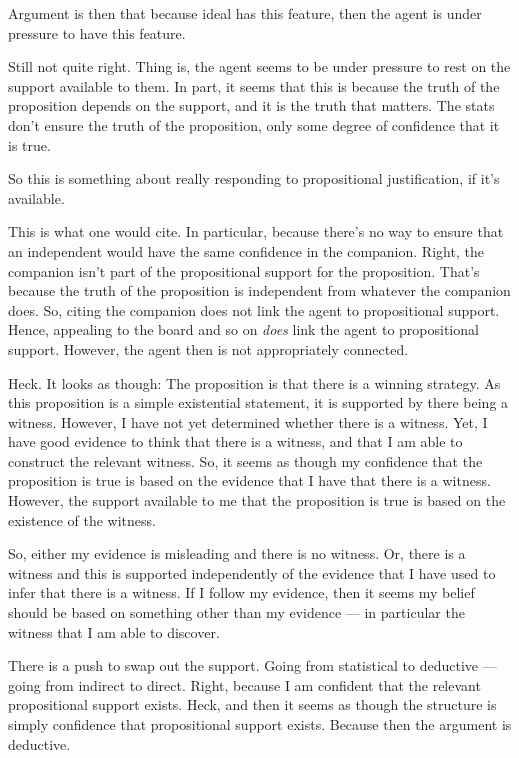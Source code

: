 \documentclass[10pt]{article}
\begin{document}
Argument is then that because ideal has this feature, then the agent is under pressure to have this feature.

Still not quite right.
Thing is, the agent seems to be under pressure to rest on the support available to them.
In part, it seems that this is because the truth of the proposition depends on the support, and it is the truth that matters.
The stats don't ensure the truth of the proposition, only some degree of confidence that it is true.

So this is something about really responding to propositional justification, if it's available.

This is what one would cite.
In particular, because there's no way to ensure that an independent would have the same confidence in the companion.
Right, the companion isn't part of the propositional support for the proposition.
That's because the truth of the proposition is independent from whatever the companion does.
So, citing the companion does not link the agent to propositional support.
Hence, appealing to the board and so on \emph{does} link the agent to propositional support.
However, the agent then is not appropriately connected.

Heck.
It looks as though:
The proposition is that there is a winning strategy.
As this proposition is a simple existential statement, it is supported by there being a witness.
However, I have not yet determined whether there is a witness.
Yet, I have good evidence to think that there is a witness, and that I am able to construct the relevant witness.
So, it seems as though my confidence that the proposition is true is based on the evidence that I have that there is a witness.
However, the support available to me that the proposition is true is based on the existence of the witness.

So, either my evidence is misleading and there is no witness.
Or, there is a witness and this is supported independently of the evidence that I have used to infer that there is a witness.
If I follow my evidence, then it seems my belief should be based on something other than my evidence --- in particular the witness that I am able to discover.

There is a push to swap out the support.
Going from statistical to deductive --- going from indirect to direct.
Right, because I am confident that the relevant propositional support exists.
Heck, and then it seems as though the structure is simply confidence that propositional support exists.
Because then the argument is deductive.
\end{document}
